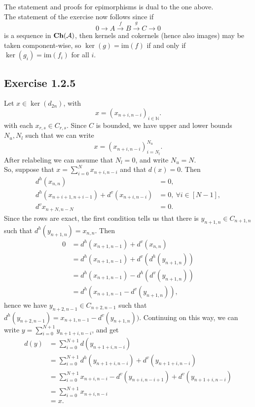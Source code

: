 \documentclass{article}
\theoremstyle{definition}
\newcommand{\N}{\mathbb{N}}
\newcommand{\im}{\text{im}}
\newcommand{\catname}[1]{{\normalfont\textbf{#1}}}
\newcommand{\Ch}{\catname{Ch}}
\begin{document}
The statement and proofs for epimorphisms is dual to the one above. \\

The statement of the exercise now follows since if 
\[
	0 \rightarrow A \xrightarrow{f} B \xrightarrow{g} C \rightarrow 0
\] 
is a sequence in $\Ch(\mathcal{A})$, then kernels and cokernels (hence also
images) may be taken component-wise, so $\ker(g) = \im(f)$ if and only if
$\ker(g_i) = \im(f_i)$ for all $i$.

\subsection*{Exercise 1.2.5}

Let $x \in \ker(d_{2n})$, with 
\[
	x = (x_{n + i, n -i})_{i \in \N}.
\] 
with each $x_{r, s} \in C_{r, s}$. Since $C$ is bounded, we have upper and
lower bounds $N_u, N_l$ such that we can write
\[
	x = (x_{n + i, n -i})_{i = N_l}^{N_u}.
\] 
After relabeling we can assume that $N_l = 0$, and write $N_u = N$. \\

So, suppose that $x = \sum_{i = 0}^{N} x_{n + i, n - i}$ and that $d(x) = 0$.
Then 
\begin{align*}
	d^h(x_{n, n}) &= 0, \\
	d^h(x_{n + i + 1, n + i - 1}) + d^v(x_{n + i, n - i}) &= 0,
	\ \forall i \in [N - 1], \\ 
	d^v{x_{n + N, n - N}} &= 0.
\end{align*} 
Since the rows are exact, the first condition tells us that there is $y_{n + 1,
n} \in C_{n + 1, n}$ such that $d^h(y_{n + 1, n}) = x_{n, n}$. Then 
\begin{align*}
	0
	&=
	d^h(x_{n + 1, n - 1}) + d^v(x_{n, n}) \\
	&=
	d^h(x_{n + 1, n - 1}) + d^v(d^h(y_{n + 1, n})) \\
	&=
	d^h(x_{n + 1, n - 1}) - d^h(d^v(y_{n + 1, n})) \\
	&=
	d^h(x_{n + 1, n - 1} - d^v(y_{n + 1, n})),
\end{align*} 
hence we have $y_{n + 2, n - 1} \in C_{n + 2, n - 1}$
such that $d^h(y_{n + 2, n - 1}) = x_{n + 1, n - 1} - d^v(y_{n + 1, n}))$.
Continuing on this way, we can write $y = \sum_{i = 0}^{N+1} y_{n + 1 + i, n - i}$,
and get
\begin{align*}
	d(y) 
	&=
	\sum_{i = 0}^{N + 1} d(y_{n + 1 + i, n - i}) \\
	&=
	\sum_{i = 0}^{N + 1} 
	d^h(y_{n + 1 + i, n - i})
	+
	d^v(y_{n + 1 + i, n - i}) \\
	&=
	\sum_{i = 0}^{N + 1} 
	x_{n + i, n - i} - d^v(y_{n + i, n - i + 1}) 
	+
	d^v(y_{n + 1 + i, n - i}) \\
	&=
	\sum_{i = 0}^{N + 1} 
	x_{n + i, n - i}  \\
	&= 
	x.
\end{align*}
\end{document}
